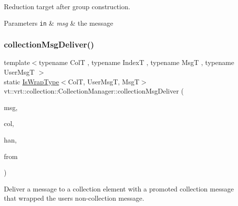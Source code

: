 Reduction target after group construction. 


\begin{DoxyParams}[1]{Parameters}
\mbox{\tt in}  & {\em msg} & the message \\
\hline
\end{DoxyParams}
\mbox{\label{structvt_1_1vrt_1_1collection_1_1_collection_manager_aeefbfe1468c9583c4ffb730b6fbdd263}} 
\subsubsection{\texorpdfstring{collection\+Msg\+Deliver()}{collectionMsgDeliver()}\hspace{0.1cm}{\footnotesize\ttfamily [1/2]}}
{\footnotesize\ttfamily template$<$typename ColT , typename IndexT , typename MsgT , typename User\+MsgT $>$ \\
static \hyperlink{structvt_1_1vrt_1_1collection_1_1_collection_manager_a1f91c97ed52237c3a3576dfbbe87c8f8}{Is\+Wrap\+Type}$<$ColT, User\+MsgT, MsgT$>$ vt\+::vrt\+::collection\+::\+Collection\+Manager\+::collection\+Msg\+Deliver (\begin{DoxyParamCaption}\item[{MsgT $\ast$}]{msg,  }\item[{\hyperlink{structvt_1_1vrt_1_1collection_1_1_collection_base}{Collection\+Base}$<$ ColT, IndexT $>$ $\ast$}]{col,  }\item[{\hyperlink{namespacevt_af64846b57dfcaf104da3ef6967917573}{Handler\+Type}}]{han,  }\item[{\hyperlink{namespacevt_a866da9d0efc19c0a1ce79e9e492f47e2}{Node\+Type}}]{from }\end{DoxyParamCaption})\hspace{0.3cm}{\ttfamily [static]}}



Deliver a message to a collection element with a promoted collection message that wrapped the user\textquotesingle{}s non-\/collection message. 


